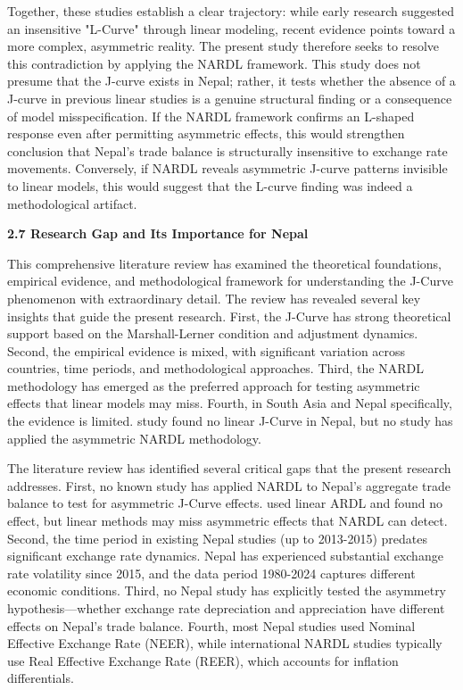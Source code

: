 \documentclass[12pt]{article}
\begin{document}
Together, these studies establish a clear trajectory: while early research suggested an insensitive "L-Curve" through linear modeling, recent evidence points toward a more complex, asymmetric reality. The present study therefore seeks to resolve this contradiction by applying the NARDL framework. This study does not presume that the J-curve exists in Nepal; rather, it tests whether the absence of a J-curve in previous linear studies is a genuine structural finding or a consequence of model misspecification. If the NARDL framework confirms an L-shaped response even after permitting asymmetric effects, this would strengthen \textcite{chaulagai2015} conclusion that Nepal's trade balance is structurally insensitive to exchange rate movements. Conversely, if NARDL reveals asymmetric J-curve patterns invisible to linear models, this would suggest that the L-curve finding was indeed a methodological artifact.

\vspace{0.5cm}
\noindent\textbf{2.7 Research Gap and Its Importance for Nepal}

This comprehensive literature review has examined the theoretical foundations, empirical evidence, and methodological framework for understanding the J-Curve phenomenon with extraordinary detail. The review has revealed several key insights that guide the present research. First, the J-Curve has strong theoretical support based on the Marshall-Lerner condition and adjustment dynamics. Second, the empirical evidence is mixed, with significant variation across countries, time periods, and methodological approaches. Third, the NARDL methodology has emerged as the preferred approach for testing asymmetric effects that linear models may miss. Fourth, in South Asia and Nepal specifically, the evidence is limited. \textcite{chaulagai2015} study found no linear J-Curve in Nepal, but no study has applied the asymmetric NARDL methodology.

The literature review has identified several critical gaps that the present research addresses. First, no known study has applied NARDL to Nepal's aggregate trade balance to test for asymmetric J-Curve effects. \textcite{chaulagai2015} used linear ARDL and found no effect, but linear methods may miss asymmetric effects that NARDL can detect. Second, the time period in existing Nepal studies (up to 2013-2015) predates significant exchange rate dynamics. Nepal has experienced substantial exchange rate volatility since 2015, and the data period 1980-2024 captures different economic conditions. Third, no Nepal study has explicitly tested the asymmetry hypothesis—whether exchange rate depreciation and appreciation have different effects on Nepal's trade balance. Fourth, most Nepal studies used Nominal Effective Exchange Rate (NEER), while international NARDL studies typically use Real Effective Exchange Rate (REER), which accounts for inflation differentials.
\end{document}
